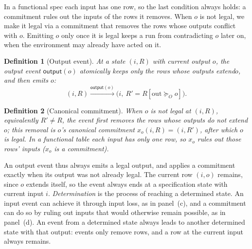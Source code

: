 \documentclass[sigconf]{cidr-2027}
\newtheorem{definition}{Definition}
\theoremstyle{remark}
\newcommand{\OutputGe}{\succeq_O}
\newcommand{\commitment}{commitment\xspace}
\newcommand{\outrel}{extends\xspace}          %
\newcommand{\outrelbase}{extend\xspace}       %
\begin{document}
\textcolor{reviewed}{In a functional spec each input has one row, so the last condition always
holds: a \commitment rules out the inputs of the rows it removes.} \textcolor{reviewed}{When $o$ is not legal,
we make it legal via a \commitment that removes the rows whose outputs conflict
with $o$.} \textcolor{reviewed}{Emitting $o$ only once it is legal keeps a run from
contradicting $o$ later on, when the environment may already have acted on it.}

\begin{definition}[Output event]
\label{def:output-event}
\textcolor{reviewed}{At a state $(i,R)$ with current output $o$, the \emph{output event}
$\mathsf{output}(o)$ atomically keeps only the rows whose outputs \outrelbase $o$,
and then emits $o$:}
\begin{equation}
  (i,R)\xrightarrow{\mathsf{output}(o)}\bigl(i,\ R' = R[\mathrm{out}\OutputGe o]\bigr).
  \label{eq:output-action}
\end{equation}
\end{definition}

\begin{definition}[Canonical \commitment]
\label{def:canonical-commitment-functional}
\textcolor{reviewed}{When $o$ is not legal at $(i,R)$, equivalently $R'\neq R$, the event first
removes the rows whose outputs do not \outrelbase $o$; this removal is
$o$'s \emph{canonical \commitment} $x_o(i,R)=(i,R')$, after which $o$ is legal.} In a functional table each
input has only one row, so $x_o$ rules out those rows' inputs ($x_o$ is a \commitment).
\end{definition}

\textcolor{reviewed}{An output event thus always emits a legal output, and applies a \commitment
exactly when its output was not already legal.} The current row $(i,o)$
remains, since $o$ \outrel itself, so the event always ends at a specification
state with current input $i$. \emph{Determination} is the process of reaching
a determined state. An input event can achieve it through input loss, as in
panel~(c), and a \commitment can do so by ruling out inputs that would
otherwise remain possible, as in panel~(d). An event from a determined state
always leads to another determined state with that output: events only
remove rows, and a row at the current input always remains.
\end{document}
